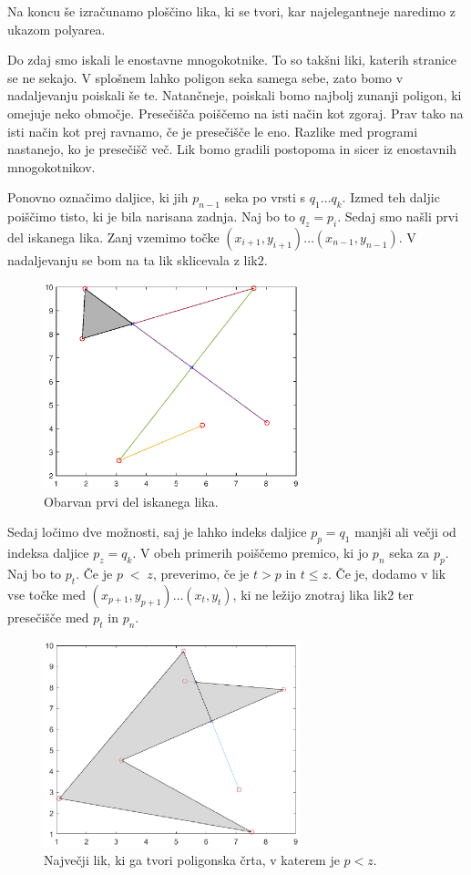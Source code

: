 \documentclass{article}
\begin{document}
Na koncu še izračunamo ploščino lika, ki se tvori, kar najelegantneje naredimo z ukazom polyarea.

Do zdaj smo iskali le enostavne mnogokotnike. To so takšni liki, katerih stranice se ne sekajo. V splošnem lahko 
poligon seka samega sebe, zato bomo v nadaljevanju poiskali še te. Natančneje, poiskali bomo najbolj zunanji poligon,
ki omejuje neko območje. Presečišča poiščemo na isti način kot zgoraj. 
Prav tako na isti način kot prej ravnamo, če je presečišče le eno. Razlike med programi nastanejo, ko je 
presečišč več.
Lik bomo gradili postopoma in sicer iz enostavnih mnogokotnikov.

Ponovno označimo daljice, ki jih $p_{n-1}$ seka po vrsti s $q_1 \dots q_k$. 
Izmed teh daljic poiščimo tisto, ki je bila narisana zadnja. Naj bo to $q_z = p_i$.
Sedaj smo našli prvi del iskanega lika. Zanj vzemimo točke $(x_{i+1}, y_{i+1}) \dots 
(x_{n-1}, y_{n-1})$. V nadaljevanju se bom na ta lik sklicevala z lik2.

\begin{figure}[H]
    \centering
        \includegraphics[height = 6cm]{del.eps}
        \caption{Obarvan prvi del iskanega lika.}
\end{figure}

Sedaj ločimo dve možnosti, saj je lahko indeks daljice $p_{p} = q_1$ manjši ali večji od indeksa daljice 
$p_{z} = q_k$. V obeh primerih poiščemo premico, ki jo $p_n$ seka za $p_{p}$. Naj bo to $p_t$.
Če je $p \; < \; z$, preverimo, če je $t > p$ in $t \leq z$. Če je, dodamo v lik vse točke
med $(x_{p + 1}, y_{p+1}) \dots (x_t, y_t)$, ki ne ležijo znotraj lika lik2 ter presečišče med $p_t$ in $p_n$.

\begin{figure}[H]
    \centering
        \includegraphics[height = 6cm]{seka3.eps}
        \caption{Največji lik, ki ga tvori poligonska črta, v katerem je $p < z$.}
\end{figure}
\end{document}
